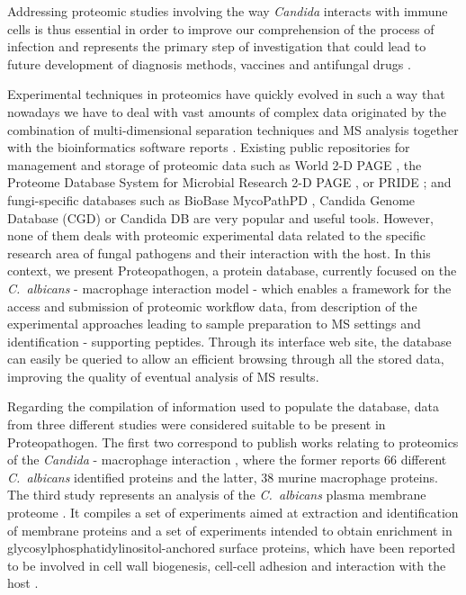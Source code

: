 Addressing proteomic studies involving the way \textit{Candida}
interacts with immune cells is thus essential in order to
improve our comprehension of the process of infection and
represents the primary step of investigation that could lead
to future development of diagnosis methods, vaccines and
antifungal drugs \citep{Fernandez-Arenas2007, Martinez-Solano2006a, Pitarch2006, Pitarch2006a}.


Experimental techniques in proteomics have quickly
evolved in such a way that nowadays we have to deal with
vast amounts of complex data originated by the combination
of multi-dimensional separation techniques and MS analysis
 together with the bioinformatics software reports \citep{Monteoliva2004}.
Existing public repositories for management and storage of
proteomic data such as World 2-D PAGE \citep{Hoogland2008}, the Proteome
Database System for Microbial Research 2-D PAGE \citep{Pleissner2004}, or
PRIDE \citep{Martens2005}; and fungi-specific databases such as BioBase
MycoPathPD \citep{Csank2002}, Candida Genome Database (CGD) \citep{Arnaud2005}
or Candida DB \citep{Rossignol2008} are very popular and useful tools.
However, none of them deals with proteomic experimental
data related to the specific research area of fungal pathogens
and their interaction with the host. In this context,
we present Proteopathogen, a protein database, currently
focused on the \textit{\mbox{C. albicans}} - macrophage interaction
model - which enables a framework for the access and
submission of proteomic workflow data, from description of
the experimental approaches leading to sample preparation
to MS settings and identification - supporting peptides.
Through its interface web site, the database can easily be
queried to allow an efficient browsing through all the stored
data, improving the quality of eventual analysis of MS
results.

Regarding the compilation of information used to
populate the database, data from three different studies were
considered suitable to be present in Proteopathogen.
The first two correspond to publish works relating to
proteomics of the \textit{Candida} - macrophage interaction
\citep{Fernandez-Arenas2007, Martinez-Solano2006a}, where the former reports 
66 different \textit{\mbox{C. albicans}}
identified proteins and the latter, 38 murine macrophage
proteins. The third study represents an analysis of the
\textit{\mbox{C. albicans}} plasma membrane proteome \citep{Cabezon2009}. It compiles
a set of experiments aimed at extraction and identification of
membrane proteins and a set of experiments intended to
obtain enrichment in glycosylphosphatidylinositol-anchored
surface proteins, which have been reported to be involved in
cell wall biogenesis, cell-cell adhesion and interaction with
the host \citep{Plaine2008}.




